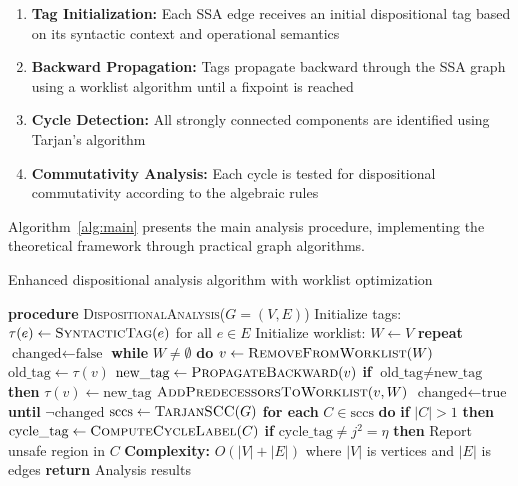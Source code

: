 \documentclass[acmsmall,anonymous,review,screen]{acmart}
\begin{document}
	\begin{enumerate}
		\item \textbf{Tag Initialization:} Each SSA edge receives an initial dispositional tag based on its syntactic context and operational semantics
		\item \textbf{Backward Propagation:} Tags propagate backward through the SSA graph using a worklist algorithm until a fixpoint is reached
		\item \textbf{Cycle Detection:} All strongly connected components are identified using Tarjan's algorithm
		\item \textbf{Commutativity Analysis:} Each cycle is tested for dispositional commutativity according to the algebraic rules
	\end{enumerate}
	
	Algorithm~\ref{alg:main} presents the main analysis procedure, implementing the theoretical framework through practical graph algorithms.
	
	\begin{algorithm}[t]
		\caption{Enhanced dispositional analysis algorithm with worklist optimization}
		\label{alg:main}
		\begin{algorithmic}[1]
			\STATE \textbf{procedure} \textsc{DispositionalAnalysis}($G = (V, E)$)
			\STATE Initialize tags: $\tau(e) \leftarrow \textsc{SyntacticTag}(e)$ for all $e \in E$
			\STATE Initialize worklist: $W \leftarrow V$
			\STATE \textbf{repeat}
			\STATE \quad $\text{changed} \leftarrow \text{false}$
			\STATE \quad \textbf{while} $W \neq \emptyset$ \textbf{do}
			\STATE \quad \quad $v \leftarrow \textsc{RemoveFromWorklist}(W)$
			\STATE \quad \quad $\text{old\_tag} \leftarrow \tau(v)$
			\STATE \quad \quad $\text{new\_tag} \leftarrow \textsc{PropagateBackward}(v)$
			\STATE \quad \quad \textbf{if} $\text{old\_tag} \neq \text{new\_tag}$ \textbf{then}
			\STATE \quad \quad \quad $\tau(v) \leftarrow \text{new\_tag}$
			\STATE \quad \quad \quad $\textsc{AddPredecessorsToWorklist}(v, W)$
			\STATE \quad \quad \quad $\text{changed} \leftarrow \text{true}$
			\STATE \textbf{until} $\neg\text{changed}$
			\STATE $\text{sccs} \leftarrow \textsc{TarjanSCC}(G)$
			\STATE \textbf{for each} $C \in \text{sccs}$ \textbf{do}
			\STATE \quad \textbf{if} $|C| > 1$ \textbf{then}
			\STATE \quad \quad $\text{cycle\_tag} \leftarrow \textsc{ComputeCycleLabel}(C)$
			\STATE \quad \quad \textbf{if} $\text{cycle\_tag} \neq j^{2} = \eta$ \textbf{then}
			\STATE \quad \quad \quad Report unsafe region in $C$
			\STATE \textbf{Complexity:} $O(|V| + |E|)$ where $|V|$ is vertices and $|E|$ is edges
			\STATE \textbf{return} Analysis results
		\end{algorithmic}
	\end{algorithm}
	
\end{document}
